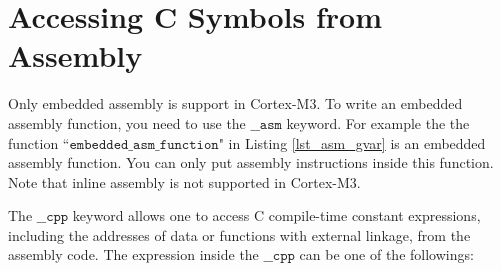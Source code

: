 \section{Accessing C Symbols from Assembly}
\label{sec_asm_c}
Only embedded assembly is support in Cortex-M3. To write an embedded assembly function, you need to use the $\mathtt{\_\_asm}$ keyword. For example the the function ``$\mathtt{embedded\_asm\_function}$" in Listing \ref{lst_asm_gvar} is an embedded assembly function. You can only put assembly instructions inside this function. Note that inline assembly is not supported in Cortex-M3.

The $\mathtt{\_\_cpp}$ keyword allows one to access C compile-time constant expressions, including the addresses of data or functions with external linkage, from the assembly code. The expression inside the $\mathtt{\_\_cpp}$ can be one of the followings:
